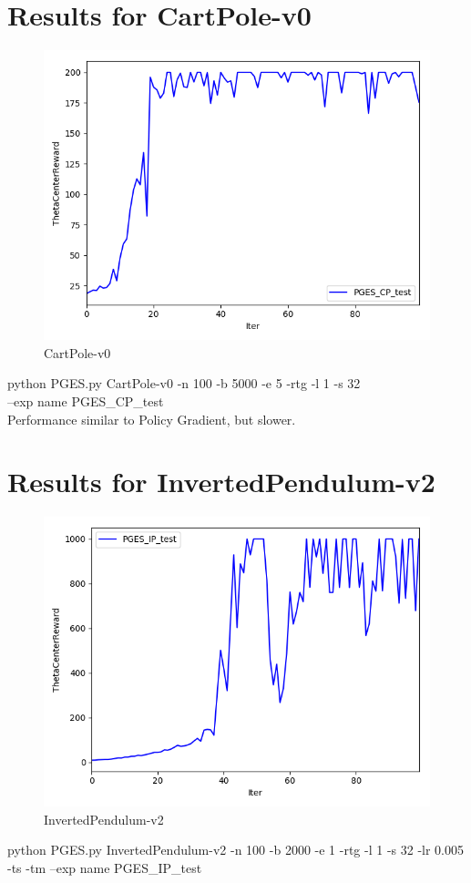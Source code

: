\documentclass{article}
\begin{document}
\newpage
\section{Results for CartPole-v0}

\begin{figure}[htbp]
	\centering
	\includegraphics[width=1.00\textwidth]{PGES_CP_test.png}
	\caption{CartPole-v0}\label{fig:digit}
\end{figure}

\large{\noindent python PGES.py CartPole-v0 -n 100  -b 5000  -e 5  -rtg  -l 1  -s 32 \\ --exp name PGES\_CP\_test} \\
\large{Performance similar to Policy Gradient, but slower.}

\newpage
\section{Results for InvertedPendulum-v2}

\begin{figure}[htbp]
	\centering
	\includegraphics[width=1.00\textwidth]{PGES_IP_test.png}
	\caption{InvertedPendulum-v2}\label{fig:digit}
\end{figure}
\large{\noindent python PGES.py InvertedPendulum-v2 -n 100  -b 2000  -e 1  -rtg  -l 1  -s 32 -lr 0.005 -ts -tm --exp name PGES\_IP\_test} \\
\end{document}
